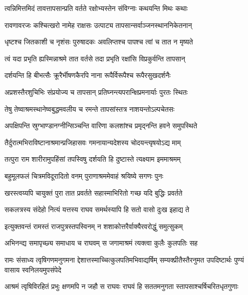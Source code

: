 \twolineshloka
{त्वन्निमित्तमिदं तावत्तापसान्प्रति वर्तते}
{रक्षोभ्यस्तेन संविग्नाः कथयन्ति मिथः कथाः} %

\twolineshloka
{रावणावरजः कश्चित्खरो नामेह राक्षसः}
{उत्पाट्य तापसान्सर्वाञ्जनस्थाननिकेतनान्} %

\twolineshloka
{धृष्टश्च जितकाशी च नृशंसः पुरुषादकः}
{अवलिप्तश्च पापश्च त्वां च तात न मृष्यते} %

\twolineshloka
{त्वं यदा प्रभृति ह्यस्मिन्नाश्रमे तात वर्तसे}
{तदा प्रभृति रक्षांसि विप्रकुर्वन्ति तापसान्} %

\twolineshloka
{दर्शयन्ति हि बीभत्सैः क्रूरैर्भीषणकैरपि}
{नाना रूपैर्विरूपैश्च रूपैरसुखदर्शनैः} %

\twolineshloka
{अप्रशस्तैरशुचिभिः संप्रयोज्य च तापसान्}
{प्रतिघ्नन्त्यपरान्क्षिप्रमनार्याः पुरतः स्थितः} %

\twolineshloka
{तेषु तेष्वाश्रमस्थानेष्वबुद्धमवलीय च}
{रमन्ते तापसांस्तत्र नाशयन्तोऽल्पचेतसः} %

\twolineshloka
{अपक्षिपन्ति स्रुग्भाण्डानग्नीन्सिञ्चन्ति वारिणा}
{कलशांश्च प्रमृद्नन्ति हवने समुपस्थिते} %

\twolineshloka
{तैर्दुरात्मभिराविष्टानाश्रमान्प्रजिहासवः}
{गमनायान्यदेशस्य चोदयन्त्यृषयोऽद्य माम्} %

\twolineshloka
{तत्पुरा राम शारीरामुपहिंसां तपस्विषु}
{दर्शयति हि दुष्टास्ते त्यक्ष्याम इममाश्रमम्} %

\twolineshloka
{बहुमूलफलं चित्रमविदूरादितो वनम्}
{पुराणाश्रममेवाहं श्रयिष्ये सगणः पुनः} %

\twolineshloka
{खरस्त्वय्यपि चायुक्तं पुरा तात प्रवर्तते}
{सहास्माभिरितो गच्छ यदि बुद्धिः प्रवर्तते} %

\twolineshloka
{सकलत्रस्य संदेहो नित्यं यत्तस्य राघव}
{समर्थस्यापि हि सतो वासो दुःख इहाद्य ते} %

\twolineshloka
{इत्युक्तवन्तं रामस्तं राजपुत्रस्तपस्विनम्}
{न शशाकोत्तरैर्वाक्यैरवरोद्धुं समुत्सुकम्} %

\twolineshloka
{अभिनन्द्य समापृच्छ्य समाधाय च राघवम्}
{स जगामाश्रमं त्यक्त्वा कुलैः कुलपतिः सह} %

\fourlineindentedshloka
{रामः संसाध्य त्वृषिगणमनुगमना}
{द्देशात्तस्माच्चित्कुलपतिमभिवाद्यर्षिम्}
{सम्यक्प्रीतैस्तैरनुमत उपदिष्टार्थः}
{ पुण्यं वासाय स्वनिलयमुपसंपेदे} %

\fourlineindentedshloka
{आश्रमं त्वृषिविरहितं प्रभुः}
{ क्षणमपि न जहौ स राघवः}
{राघवं हि सततमनुगता}
{स्तापसाश्चर्षिचरितधृतगुणाः} %


